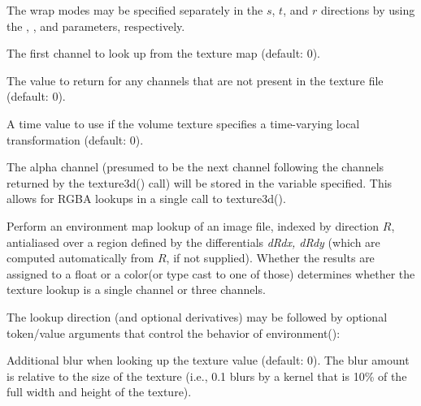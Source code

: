 \documentclass[11pt,letterpaper]{book}
\def\color{{\cf color}\xspace}
\def\float{{\cf float}\xspace}
\begin{document}
The wrap modes may be specified separately in the $s$, $t$, and $r$
directions by using the , , and 
parameters, respectively.
\apiend
\vspace{-16pt}

\vspace{12pt}
The first channel to look up from the texture map (default: 0).
\apiend
\vspace{-16pt}

\vspace{12pt}
The value to return for any channels that are not present in the texture
file (default: 0).
\apiend
\vspace{-16pt}

\vspace{12pt}
A time value to use if the volume texture specifies a time-varying
local transformation (default: 0).
\apiend
\vspace{-16pt}

\vspace{12pt}
The alpha channel (presumed to be the next channel following the
channels returned by the {\cf texture3d()} call) will be stored in the
variable specified.  This allows for RGBA lookups in a single call to
{\cf texture3d()}.
\apiend
\vspace{-16pt}

\apiend


Perform an environment map lookup of an image file, indexed by direction
$R$, antialiased over a region defined by the differentials
\emph{dRdx, dRdy} (which are computed
automatically from $R$, if not supplied).  Whether the results
are assigned to a \float or a \color (or type cast to one of those)
determines whether the texture lookup is a single channel or three
channels.

The lookup direction (and optional derivatives) may be followed by optional token/value
arguments that control the behavior of {\cf environment()}:

\vspace{12pt}
Additional blur when looking up the texture value (default: 0).  The
blur amount is relative to the size of the texture (i.e., 0.1 blurs by a
kernel that is 10\% of the full width and height of the texture).
\end{document}
